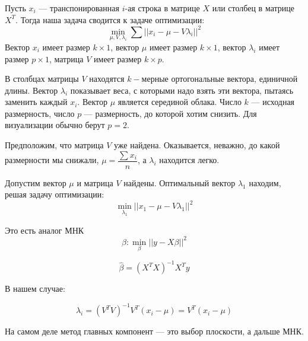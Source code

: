 \documentclass[12pt]{article} %
\theoremstyle{definition} %
\begin{document}
Пусть $x_i$ — транспонированная $i$-ая строка в матрице $X$ или столбец в матрице $X^T$.
Тогда наша задача сводится к задаче оптимизации:
\[\min_{\mu, V, \lambda_i} \sum ||x_i-\mu-V \lambda_i||^2 \]
Вектор $x_i$ имеет размер $k \times 1$, вектор $\mu$ имеет размер $k \times 1$, вектор $\lambda_i$ имеет размер $p \times 1$, матрица $V$ имеет размер $k \times p$.

В столбцах матрицы $V$ находятся $k-$мерные ортогональные вектора, единичной длины. Вектор $\lambda_i$ показывает веса, с которыми надо взять эти вектора, пытаясь заменить каждый $x_i$. Вектор $\mu$ является серединой облака. Число $k$ — исходная размерность, число $p$ — размерность, до которой хотим снизить. Для визуализации обычно берут $p=2$.

Предположим, что матрица $V$ уже найдена. Оказывается, неважно, до какой размерности мы снижали, $\mu=\dfrac{\sum x_i}{n}$, а $\lambda_i$ находится легко.

Допустим вектор $\mu$ и матрица $V$ найдены. Оптимальный вектор $\lambda_1$ находим, решая задачу оптимизации:
\[\min_{\lambda_1} ||x_1-\mu-V {\lambda_1}||^2 \]

Это есть аналог МНК \[ \beta:  \min_\beta ||y-X\beta||^2 \]

\[\hat{\beta}=(X^TX)^{-1}X^Ty \]

В нашем случае:

\[\lambda_i=(V^TV)^{-1}V^T(x_i-\mu)=V^T(x_i-\mu)\]

На самом деле метод главных компонент — это выбор плоскости, а дальше МНК.
\end{document}
